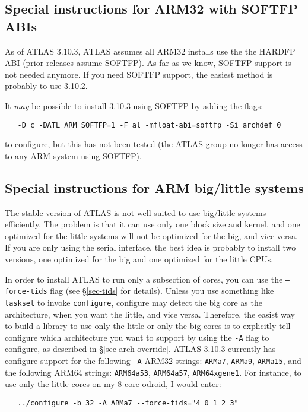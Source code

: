 \documentclass[11pt]{article}
\begin{document}
\subsection{Special instructions for ARM32 with SOFTFP ABIs}
As of ATLAS 3.10.3, ATLAS assumes all ARM32 installs use the the HARDFP ABI
(prior releases assume SOFTFP).  As far as we know, SOFTFP support is not
needed anymore.  If you need SOFTFP support, the easiest method is probably
to use 3.10.2.

It {\em may} be possible to install 3.10.3 using SOFTFP by adding
the flags:
\begin{verbatim}
   -D c -DATL_ARM_SOFTFP=1 -F al -mfloat-abi=softfp -Si archdef 0
\end{verbatim}
to configure, but this has not been tested (the ATLAS group no longer has
access to any ARM system using SOFTFP).

\subsection{Special instructions for ARM big/little systems}
The stable version of ATLAS is not well-suited to use big/little systems
efficiently.   The problem is that it can use only one block size and
kernel, and one optimized for the little systems will not be optimized
for the big, and vice versa.  If you are only using the serial interface,
the best idea is probably to install two versions, one optimized 
for the big and one optimized for the little CPUs.

In order to install ATLAS to run only a subsection of cores, you can use
the {\tt --force-tids} flag (see \S\ref{sec-tids} for details).  Unless
you use something like {\tt tasksel} to invoke {\tt configure}, configure
may detect the big core as the architecture, when you want the little, and
vice versa.  Therefore, the easist way to build a library to use only
the little or only the big cores is to
explicitly tell configure which architecture you want to support by using
the {\tt -A} flag to configure, as described in \S\ref{sec-arch-override}.
ATLAS 3.10.3 currently has configure support for the following {\tt -A} 
ARM32 strings: \texttt{ARMa7}, \texttt{ARMa9}, \texttt{ARMa15},
and the following ARM64 strings:
\texttt{ARM64a53}, \texttt{ARM64a57}, \texttt{ARM64xgene1}.
For instance, to use only the little cores on my 8-core odroid, I would
enter:
\begin{verbatim}
   ../configure -b 32 -A ARMa7 --force-tids="4 0 1 2 3"
\end{verbatim}
\end{document}
